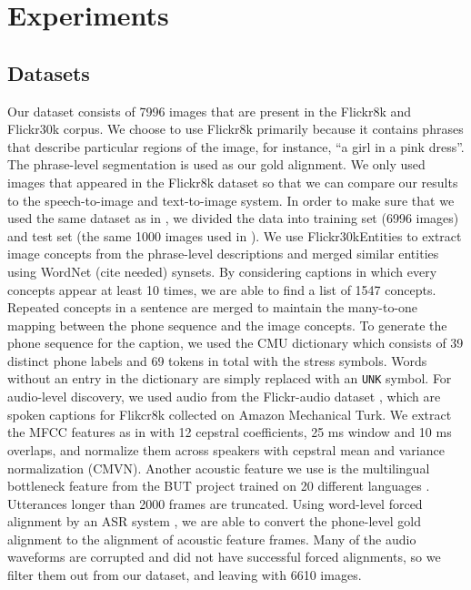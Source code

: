\documentclass[journal]{IEEEtran}
\begin{document}

\section{Experiments}
\subsection{Datasets}
Our dataset consists of 7996 images that are present in the Flickr8k and Flickr30k corpus. We choose to use Flickr8k primarily because it contains phrases that describe particular regions of the image, for instance, ``a girl in a pink dress''. The phrase-level segmentation is used as our gold alignment. We only used images that appeared in the Flickr8k dataset so that we can compare our results to the speech-to-image \cite{Harwath15} and text-to-image \cite{Karpathy15} system. In order to make sure that we used the same dataset as in \cite{Karpathy15, Harwath15}, we divided the data into training set (6996 images) and test set (the same 1000 images used in \cite{Karpathy15, Harwath15}).  We use Flickr30kEntities to extract image concepts from the phrase-level descriptions and merged similar entities using WordNet (cite needed) synsets. By considering captions in which every concepts appear at least 10 times, we are able to find a list of 1547 concepts. Repeated concepts in a sentence are merged to maintain the many-to-one mapping between the phone sequence and the image concepts. To generate the phone sequence for the caption, we used the CMU dictionary which consists of 39 distinct phone labels and 69 tokens in total with the stress symbols. Words without an entry in the dictionary are simply replaced with an \texttt{UNK} symbol. For audio-level discovery, we used audio from the Flickr-audio dataset \cite{Harwath15}, which are spoken captions for Flikcr8k collected on Amazon Mechanical Turk. We extract the MFCC features as in \cite{Rasanen2015, Kamper2016} with 12 cepstral coefficients, 25 ms window and 10 ms overlaps, and normalize them across speakers with cepstral mean and variance normalization (CMVN). Another acoustic feature we use is the multilingual bottleneck feature from the BUT project  trained on 20 different languages \cite{Fer2017}. Utterances longer than 2000 frames are truncated. Using word-level forced alignment by an ASR system \cite{Adda2016}, we are able to convert the phone-level gold alignment to the alignment of acoustic feature frames. Many of the audio waveforms are corrupted and did not have successful forced alignments, so we filter them out from our dataset, and leaving with 6610 images. 
 
\end{document}
